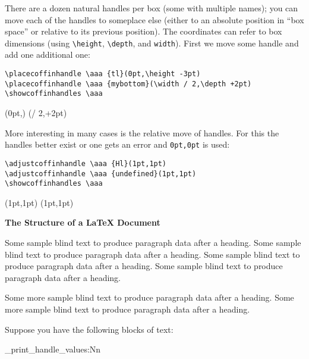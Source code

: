 \documentclass{article}
\newcommand\cbox[2][.8]{{\setlength\fboxsep{0pt}\colorbox[gray]{#1}{#2}}}
\begin{document}
There are a dozen natural handles per box (some with multiple names); you can
move each of the handles to someplace else (either to an absolute position in
``box space'' or relative to its previous position).  The coordinates can
refer to box dimensions (using \verb|\height|, \verb|\depth|,
 and \verb|width|). First we move some handle and add one
additional one:
\begin{verbatim}
\placecoffinhandle \aaa {tl}(0pt,\height -3pt)
\placecoffinhandle \aaa {mybottom}(\width / 2,\depth +2pt)
\showcoffinhandles \aaa
\end{verbatim}
\placecoffinhandle {}(0pt,\height -3pt)
\placecoffinhandle {}(\width / 2,\depth +2pt)
\showcoffinhandles \aaa

More interesting in many cases is the relative move of handles. For this the
handles better exist or one gets an error and \texttt{0pt,0pt} is used:
\begin{verbatim}
\adjustcoffinhandle \aaa {Hl}(1pt,1pt)
\adjustcoffinhandle \aaa {undefined}(1pt,1pt)
\showcoffinhandles \aaa
\end{verbatim}
\adjustcoffinhandle {}(1pt,1pt)
\adjustcoffinhandle {}(1pt,1pt)
\showcoffinhandles \aaa


\sbox {}

\setvcoffin \bbb {11cm}
   {\raggedleft\normalfont\fontsize{36}{38pt}\bfseries 
    The Structure of a \LaTeX{} Document}

\setvcoffin \ccc {13cm}
   {Some sample blind text to produce paragraph data after a heading.
    Some sample blind text to produce paragraph data after a heading.
    Some sample blind text to produce paragraph data after a heading.
    Some sample blind text to produce paragraph data after a heading.
    \par
    Some more sample blind text to produce paragraph data after a heading.
    Some more sample blind text to produce paragraph data after a heading.
}


Suppose you have the following blocks of text:

\bigskip

\noindent\cbox{\usebox\aaa}

\begin{multicols}{2}
\ttfamily\tiny
\ExplSyntaxOn
   \noindent \coffin_print_handle_values:Nn \aaa \\ 
\ExplSyntaxOff
\end{multicols}
\end{document}
